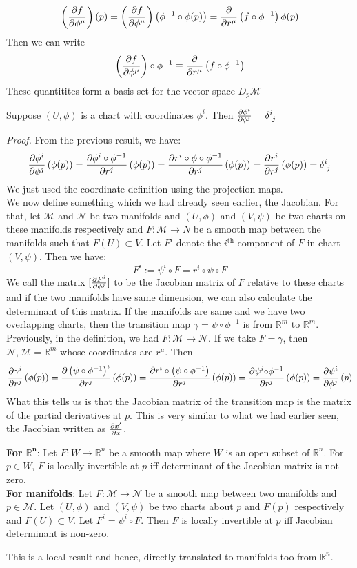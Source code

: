 $$\left( \pdv{f}{\phi^\mu} \right) \left( p \right) = \left( \pdv{f}{\phi^\mu} \right)\left( \phi^{-1}\circ \phi(p) \right) = \pdv{r^\mu}\left( f\circ \phi^{-1} \right){\phi(p)}$$
Then we can write 
$$\left( \pdv{f}{\phi^\mu} \right)\circ \phi^{-1} \equiv   \pdv{r^\mu}\left( f\circ \phi^{-1} \right)$$
These quantitites form a basis set for the vector space $D_p\mathcal{M}$
\begin{proposition}
  Suppose $(U,\phi)$ is a chart with coordinates $\phi^i$. Then $\pdv{\phi^i}{\phi^j} = \tensor{\delta}{^i _j}$
\end{proposition}
\textit{Proof.} From the previous result, we have:
$$\pdv{\phi^i}{\phi^j}\brac{\phi(p)} = \pdv{\phi^i \circ \phi^{-1}}{r^j}\brac{\phi(p)} = \pdv{r^i\circ \phi \circ \phi^{-1}}{r^j}\brac{\phi(p)} =\pdv{r^i}{r^j}\brac{\phi(p)} = \tensor{\delta}{^i _j}$$
We just used the coordinate definition using the projection maps. \\[0.3cm]
We now define something which we had already seen earlier, the Jacobian. For that, let $\mathcal{M}$ and $\mathcal{N}$ be two manifolds and $(U,\phi)$ and $(V,\psi)$ be two charts on these manifolds respectively and $F: \mathcal{M}\rightarrow N$ be a smooth map between the manifolds such that $F(U) \subset V$. Let $F^i$ denote the $i^{\text{th}}$ component of $F$ in chart $(V,\psi)$. Then we have:
$$F^i := \psi^i \circ F = r^i \circ \psi \circ F$$
We call the matrix $[\pdv{F^i}{\phi^j}]$ to be the Jacobian matrix of $F$ relative to these charts and if the two manifolds have same dimension, we can also calculate the determinant of this matrix. If the manifolds are same and we have two overlapping charts, then the transition map $\gamma = \psi \circ \phi^{-1}$ is from $\mathbb{R}^m$ to $\mathbb{R}^m$. Previously, in the definition, we had $F:\mathcal{M}\rightarrow \mathcal{N}$. If we take $F= \gamma$, then $\mathcal{N},\mathcal{M} = \mathbb{R}^m$ whose coordinates are $r^\mu$. Then
$$\pdv{\gamma^i}{r^j}\left( \phi(p) \right) = \pdv{\left( \psi \circ \phi^{-1} \right)^i}{r^j}\left( \phi(p) \right) =\pdv{r^i \circ \left( \psi \circ \phi^{-1} \right)}{r^j}\left( \phi(p) \right) = \pdv{ \psi^i { \circ \phi^{-1}}}{r^j}\left( \phi(p) \right) = \pdv{\psi^i}{\phi^j}\left( p \right)$$
What this tells us is that the Jacobian matrix of the transition map is the matrix of the partial derivatives at $p$. This is very similar to what we had earlier seen, the Jacobian written as $\pdv{x'}{x}$. 

\begin{theorem}
  \textbf{For $\mathbf{\mathbb{R}^n}$}: Let $F: W\rightarrow \mathbb{R}^n$ be a smooth map where $W$ is an open subset of $\mathbb{R}^n$. For $p\in W$, $F$ is locally invertible at $p$ iff determinant of the Jacobian matrix is not zero. \\[0.2cm]
  \textbf{For manifolds}: Let $F:\mathcal{M}\rightarrow \mathcal{N}$ be a smooth map between two manifolds and $p\in \mathcal{M}$. Let $(U,\phi)$ and $(V,\psi)$ be two charts about $p$ and $F(p)$ respectively and $F(U)\subset V$. Let $F^i = \psi^i \circ F$. Then $F$ is locally invertible at $p$ iff Jacobian determinant is non-zero.
\end{theorem}
This is a local result and hence, directly translated to manifolds too from $\mathbb{R}^n$.
